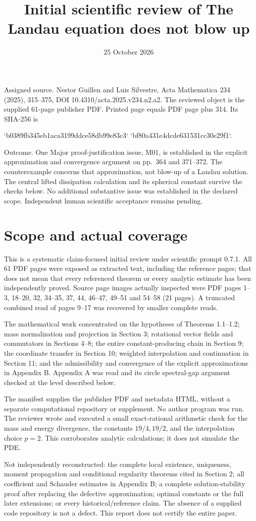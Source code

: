 \documentclass[10pt]{article}
\title{Initial scientific review of
The Landau equation does not blow up}
\author{}
\date{25 October 2026}
\begin{document}
\maketitle
Assigned source. Nestor Guillen and Luis Silvestre, Acta Mathematica 234 (2025), 315–375, DOI 10.4310/acta.2025.v234.n2.a2. The reviewed object is the supplied 61-page publisher PDF. Printed page equals PDF page plus 314. Its SHA-256 is\par
`b0389fb345eb1aca3199ddce58db99e83c3`
`bf80a431e4dcde631531cc30e29f1`.\par
Outcome. One Major proof-justification issue, M01, is established in the explicit approximation and convergence argument on pp. 364 and 371–372. The counterexample concerns that approximation, not blow-up of a Landau solution. The central lifted dissipation calculation and its spherical constant survive the checks below. No additional substantive issue was established in the declared scope. Independent human scientific acceptance remains pending.\par
\section*{Scope and actual coverage}
This is a systematic claim-focused initial review under scientific prompt 0.7.1. All 61 PDF pages were exposed as extracted text, including the reference pages; that does not mean that every referenced theorem or every analytic estimate has been independently proved. Source page images actually inspected were PDF pages 1–3, 18–20, 32, 34–35, 37, 44, 46–47, 49–51 and 54–58 (21 pages). A truncated combined read of pages 9–17 was recovered by smaller complete reads.\par
The mathematical work concentrated on the hypotheses of Theorems 1.1–1.2; mass normalization and projection in Section 3; rotational vector fields and commutators in Sections 4–8; the entire constant-producing chain in Section 9; the coordinate transfer in Section 10; weighted interpolation and continuation in Section 11; and the admissibility and convergence of the explicit approximations in Appendix B. Appendix A was read and its circle spectral-gap argument checked at the level described below.\par
The manifest supplies the publisher PDF and metadata HTML, without a separate computational repository or supplement. No author program was run. The reviewer wrote and executed a small exact-rational arithmetic check for the mass and energy divergence, the constants \(19/4,19/2\), and the interpolation choice \(p=2\). This corroborates analytic calculations; it does not simulate the PDE.\par
Not independently reconstructed: the complete local existence, uniqueness, moment propagation and conditional regularity theorems cited in Section 2; all coefficient and Schauder estimates in Appendix B; a complete solution-stability proof after replacing the defective approximation; optimal constants or the full later extensions; or every historical/reference claim. The absence of a supplied code repository is not a defect. This report does not certify the entire paper.\par
\end{document}
